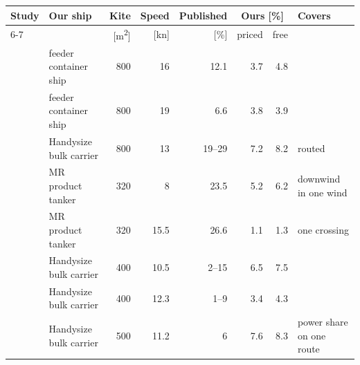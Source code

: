 \begin{tabular}{@{}llrrrrrl@{}}
\toprule
Study & Our ship & Kite & Speed & Published & \multicolumn{2}{c}{Ours [\%]} & Covers \\
\cmidrule(lr){6-7}
 & & [\si{m^2}] & [kn] & [\%] & priced & free & \\
\midrule
\citet{podeur2016} & feeder container ship & 800 & 16 & 12.1 & 3.7 & 4.8 &  \\
\citet{podeur2016} & feeder container ship & 800 & 19 & 6.6 & 3.8 & 3.9 &  \\
\citet{bentin2018} & Handysize bulk carrier & 800 & 13 & 19--29 & 7.2 & 8.2 & routed \\
\citet{leloup2013} & MR product tanker & 320 & 8 & 23.5 & 5.2 & 6.2 & downwind in one wind \\
\citet{leloup2013} & MR product tanker & 320 & 15.5 & 26.6 & 1.1 & 1.3 & one crossing \\
\citet{cedelft2016} & Handysize bulk carrier & 400 & 10.5 & 2--15 & 6.5 & 7.5 &  \\
\citet{cedelft2016} & Handysize bulk carrier & 400 & 12.3 & 1--9 & 3.4 & 4.3 &  \\
\citet{traut2014} & Handysize bulk carrier & 500 & 11.2 & 6 & 7.6 & 8.3 & power share on one route \\
\bottomrule
\end{tabular}
